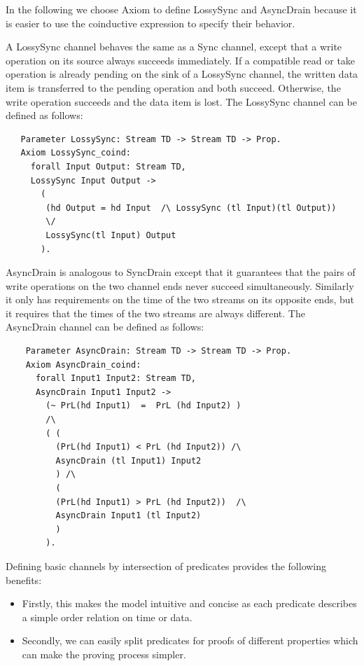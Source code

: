 \documentclass{llncs}
\begin{document}
In the following we choose Axiom to define LossySync and AsyncDrain
because it is easier to use the coinductive expression to specify
their behavior.

A LossySync channel behaves the same as a Sync channel, except that a write operation on its source always succeeds immediately. If a compatible read or take operation is already pending on the sink of a LossySync channel, the written data item is transferred to the pending operation and both succeed. Otherwise, the write operation succeeds and the data item is lost. The LossySync channel can be defined as follows:
\begin{verbatim}
   Parameter LossySync: Stream TD -> Stream TD -> Prop.
   Axiom LossySync_coind:
     forall Input Output: Stream TD,
     LossySync Input Output ->
       (
        (hd Output = hd Input  /\ LossySync (tl Input)(tl Output))
        \/
        LossySync(tl Input) Output
       ).
\end{verbatim}

AsyncDrain is analogous to SyncDrain except that it guarantees that the pairs of write operations on the two channel ends never succeed simultaneously. Similarly it only has requirements on the time of the two streams on its opposite ends, but it requires that the times of the two streams are always different. The AsyncDrain channel can be defined as follows:
\begin{verbatim}
    Parameter AsyncDrain: Stream TD -> Stream TD -> Prop.
    Axiom AsyncDrain_coind:
      forall Input1 Input2: Stream TD,
      AsyncDrain Input1 Input2 ->
        (~ PrL(hd Input1)  =  PrL (hd Input2) )
        /\
        ( (
          (PrL(hd Input1) < PrL (hd Input2)) /\
          AsyncDrain (tl Input1) Input2
          ) /\
          (
          (PrL(hd Input1) > PrL (hd Input2))  /\
          AsyncDrain Input1 (tl Input2)
          )
        ).
\end{verbatim}

Defining basic channels by intersection of predicates provides the following benefits:
\begin{itemize}
\item Firstly, this makes the model intuitive and concise as each predicate describes a simple order relation on time or data.
\item Secondly, we can easily split predicates for proofs of different properties which can make the proving process simpler.
\end{itemize}
\end{document}
